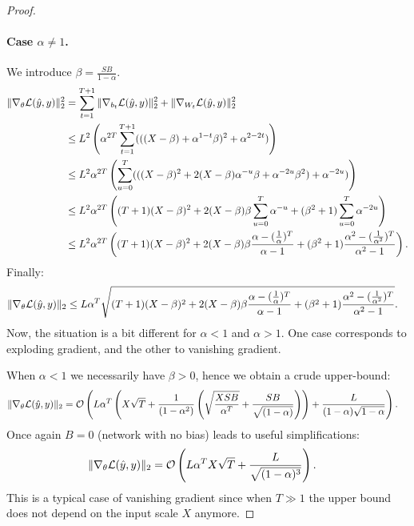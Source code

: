 \begin{proof}
    \paragraph{Case $\alpha\neq 1$.} We introduce $\beta=\frac{SB}{1-\alpha}$.
    \begin{align}
        \|\nabla_{\theta}\mathcal{L}(\hat y,y)\|^2_2&= \sum_{t=1}^{T+1}\|\nabla_{b_t}\mathcal{L}(\hat y,y)\|^2_2+\|\nabla_{W_t}\mathcal{L}(\hat y,y)\|^2_2\\
                      &\leq L^2\left(\alpha^{2T}\sum_{t=1}^{T+1}(((X-\beta)+\alpha^{1-t}\beta)^2+\alpha^{2-2t})\right)\\
                      &\leq L^2\alpha^{2T}\left(\sum_{u=0}^{T}(((X-\beta)^2+2(X-\beta)\alpha^{-u}\beta+\alpha^{-2u}\beta^2)+\alpha^{-2u})\right)\\
                      &\leq L^2\alpha^{2T}\left((T+1)(X-\beta)^2+2(X-\beta)\beta\sum_{u=0}^{T}\alpha^{-u}+(\beta^2+1)\sum_{u=0}^{T}\alpha^{-2u}\right)\\
                      &\leq L^2\alpha^{2T}\left((T+1)(X-\beta)^2+2(X-\beta)\beta\frac{\alpha-(\frac{1}{\alpha})^T}{\alpha-1}+(\beta^2+1)\frac{\alpha^2-(\frac{1}{\alpha^2})^T}{\alpha^2-1}\right).
    \end{align}
    Finally:
    \begin{align}
        \|\nabla_{\theta}\mathcal{L}(\hat y,y)\|_2 &\leq L\alpha^T\sqrt{(T+1)(X-\beta)^2+2(X-\beta)\beta\frac{\alpha-(\frac{1}{\alpha})^T}{\alpha-1}+(\beta^2+1)\frac{\alpha^2-(\frac{1}{\alpha^2})^T}{\alpha^2-1}}.
    \end{align}
    Now, the situation is a bit different for $\alpha<1$ and $\alpha>1$. One case corresponds to exploding gradient, and the other to vanishing gradient.  
      
    When $\alpha<1$ we necessarily have $\beta>0$, hence we obtain a crude upper-bound:
    \begin{align}
        \|\nabla_{\theta}\mathcal{L}(\hat y,y)\|_2 &=\mathcal{O}\left(L\alpha^T\left(X\sqrt{T}+\frac{1}{(1-\alpha^2)}\left(\sqrt{\frac{XSB}{\alpha^T}}+\frac{SB}{\sqrt{(1-\alpha)}}\right)\right)+\frac{L}{(1-\alpha)\sqrt{1-\alpha}}\right).
    \end{align}
    Once again $B=0$ (network with no bias) leads to useful simplifications:
    \begin{align}
        \|\nabla_{\theta}\mathcal{L}(\hat y,y)\|_2 &=\mathcal{O}\left(L\alpha^TX\sqrt{T}+\frac{L}{\sqrt{(1-\alpha)^3}}\right).
    \end{align}
    This is a typical case of vanishing gradient since when $T\gg 1$ the upper bound does not depend on the input scale $X$ anymore.  


\end{proof}
